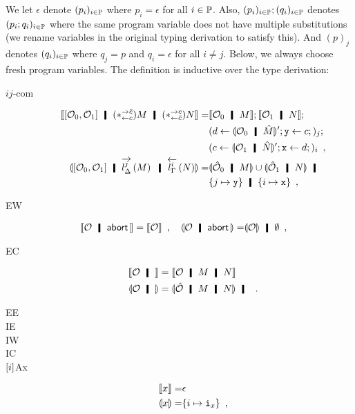 {We let $\epsilon$ denote $(p_i)_{i\in\mathbb{P}}$ where $p_i=\epsilon$
for all $i\in\mathbb{P}$.
Also, $(p_i)_{i\in\mathbb{P}}; (q_i)_{i\in\mathbb{P}}$ denotes
$(p_i; q_i)_{i\in\mathbb{P}}$ where the
same program variable does not have multiple substitutions
(we rename variables in the original typing derivation to satisfy this).
And $(p)_j$ denotes $(q_i)_{i\in\mathbb{P}}$ where $q_j = p$ and $q_i =
\epsilon$ for all $i\neq j$.
Below, we always choose fresh program variables.
The definition is inductive over the type derivation:
\begin{description}
 \item[$ij$-com]
      \begin{align*}
 \semo{\cotuple{\hypert_0,\hypert_1}\hmid (\comodL) M\hmid (\comodR) N}
 =& \semo{\hypert_0\hmid M};
 \semo{\hypert_1\hmid N};\\
 &(d\leftarrow \semoi{\hypert_0\hmid\hat M}'; \p
 y\leftarrow c;)_j; \\
 &(c\leftarrow \semoi{\hypert_1\hmid\hat N}'; \p
 x\leftarrow d;)_i\enspace,\\
 \semoi{\cotuple{\hypert_0,\hypert_1}\hmid\ltor j l \Delta M\hmid \rtol
       i l\Gamma N} =&
 \semoi{\hat \hypert_0\hmid M} \cup \semoi{\hat \hypert_1\hmid N}
       \hmid\\& \{j\mapsto\p y\}\hmid \{i\mapsto \p x\}\enspace,
      \end{align*}
 \item[EW] \begin{align*}
 \semo{\hypert\hmid \abort}=\semo{\hypert}\enspace,\quad
 \semoi{\hypert\hmid\abort}=&\semoi{\hypert}\hmid \emptyset\enspace,\quad
	   \end{align*}
 \item[EC] 
\begin{align*}
 \semo{\hypert\hmid }&= \semo{\hypert\hmid M \hmid N}\\
 \semoi{\hypert\hmid }&= \semoi{\hat\hypert\hmid M\hmid N}
 \hmid
 \enspace.
\end{align*}
 \item[EE] 
 \item[IE] 
 \item[IW] 
 \item[IC] 
 \item[$\lbrack {i}\rbrack$Ax] 
\begin{align*}
 \semo{x}=& \epsilon \enspace\\
 \semoi{x}=& \{i\mapsto \p i_x\}\enspace,

\end{align*}
\end{description}}
